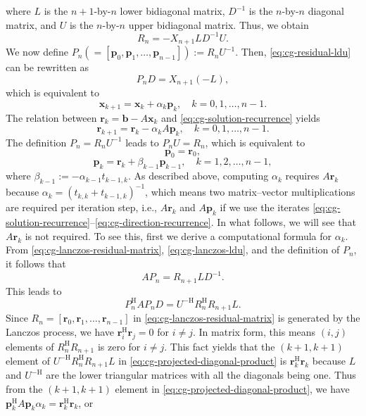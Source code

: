 {where $L$ is the $n+1$-by-$n$ lower bidiagonal matrix, $D^{-1}$ is the $n$-by-$n$ diagonal matrix, and $U$ is the $n$-by-$n$ upper bidiagonal matrix. Thus, we obtain}
\begin{equation}\label{eq:cg-residual-ldu}R_n=-X_{n+1}LD^{-1}U.\end{equation}
{We now define $P_n(=[\bm p_0,\bm p_1,\ldots,\bm p_{n-1}]):=R_nU^{-1}$. Then, \eqref{eq:cg-residual-ldu} can be rewritten as}
\begin{equation}\label{eq:cg-direction-matrix}P_nD=X_{n+1}(-L),\end{equation}
{which is equivalent to}
\begin{equation}\label{eq:cg-solution-recurrence}\bm x_{k+1}=\bm x_k+\alpha_k\bm p_k,\quad k=0,1,\ldots,n-1.\end{equation}
{The relation between $\bm r_k=\bm b-A\bm x_k$ and \eqref{eq:cg-solution-recurrence} yields}
\begin{equation}\label{eq:cg-residual-recurrence}\bm r_{k+1}=\bm r_k-\alpha_kA\bm p_k,\quad k=0,1,\ldots,n-1.\end{equation}
{The definition $P_n=R_nU^{-1}$ leads to $P_nU=R_n$, which is equivalent to}
\begin{equation}\label{eq:cg-initial-direction}\bm p_0=\bm r_0,\end{equation}
\begin{equation}\label{eq:cg-direction-recurrence}\bm p_k=\bm r_k+\beta_{k-1}\bm p_{k-1},\quad k=1,2,\ldots,n-1,\end{equation}
{where $\beta_{k-1}:=-\alpha_{k-1}t_{k-1,k}$. As described above, computing $\alpha_k$ requires $A\bm r_k$ because $\alpha_k=(t_{k,k}+t_{k-1,k})^{-1}$, which means two matrix--vector multiplications are required per iteration step, i.e., $A\bm r_k$ and $A\bm p_k$ if we use the iterates \eqref{eq:cg-solution-recurrence}--\eqref{eq:cg-direction-recurrence}. In what follows, we will see that $A\bm r_k$ is not required. To see this, first we derive a computational formula for $\alpha_k$.}
{From \eqref{eq:cg-lanczos-residual-matrix}, \eqref{eq:cg-lanczos-ldu}, and the definition of $P_n$, it follows that}
\[AP_n=R_{n+1}LD^{-1}.\]
{This leads to}
\begin{equation}\label{eq:cg-projected-diagonal-product}P_n^{\mathrm H}AP_nD=U^{-\mathrm H}R_n^{\mathrm H}R_{n+1}L.\end{equation}
{Since $R_n=[\bm r_0,\bm r_1,\ldots,\bm r_{n-1}]$ in \eqref{eq:cg-lanczos-residual-matrix} is generated by the Lanczos process, we have $\bm r_i^{\mathrm H}\bm r_j=0$ for $i\ne j$. In matrix form, this means $(i,j)$ elements of $R_n^{\mathrm H}R_{n+1}$ is zero for $i\ne j$. This fact yields that the $(k+1,k+1)$ element of $U^{-\mathrm H}R_n^{\mathrm H}R_{n+1}L$ in \eqref{eq:cg-projected-diagonal-product} is $\bm r_k^{\mathrm H}\bm r_k$ because $L$ and $U^{-\mathrm H}$ are the lower triangular matrices with all the diagonals being one. Thus from the $(k+1,k+1)$ element in \eqref{eq:cg-projected-diagonal-product}, we have $\bm p_k^{\mathrm H}A\bm p_k\alpha_k=\bm r_k^{\mathrm H}\bm r_k$, or}
